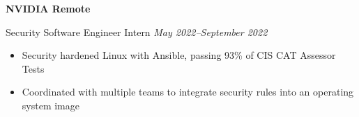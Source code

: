 \textbf{NVIDIA \hfill Remote}\par

Security Software Engineer Intern \hfill \textit{May 2022--September 2022}
\begin{itemize}
	\item Security hardened Linux with Ansible, passing 93\% of CIS CAT Assessor Tests
	\item Coordinated with multiple teams to integrate security rules into an operating system image
\end{itemize}\par
